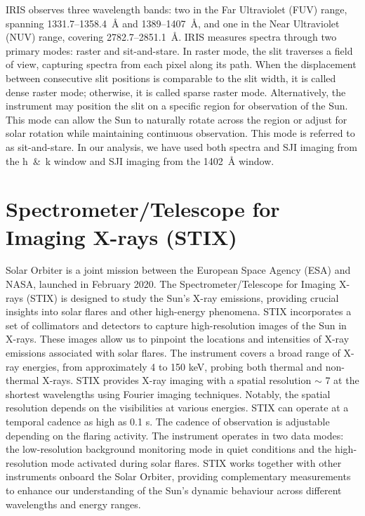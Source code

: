 IRIS observes three wavelength bands: two in the Far Ultraviolet (FUV) range, spanning 1331.7{--}1358.4~{\AA} and 1389{--}1407~{\AA}, and one in the Near Ultraviolet (NUV) range, covering 2782.7{--}2851.1~{\AA}. IRIS measures spectra through two primary modes: raster and sit-and-stare. In raster mode, the slit traverses a field of view, capturing spectra from each pixel along its path. When the displacement between consecutive slit positions is comparable to the slit width, it is called dense raster mode; otherwise, it is called sparse raster mode. Alternatively, the instrument may position the slit on a specific region for observation of the Sun. This mode can allow the Sun to naturally rotate across the region or adjust for solar rotation while maintaining continuous observation. This mode is referred to as sit-and-stare. In our analysis, we have used both spectra and SJI imaging from the  h~\&~k window and SJI imaging from the  1402~{\AA} window.

\section{Spectrometer/Telescope for Imaging X-rays (STIX)}

Solar Orbiter \citep[SO;][]{so} is a joint mission between the European Space Agency (ESA) and NASA, launched in February 2020. The Spectrometer/Telescope for Imaging X-rays (STIX) \citep[STIX,][]{stix,stix1} is designed to study the Sun's X-ray emissions, providing crucial insights into solar flares and other high-energy phenomena. STIX incorporates a set of collimators and detectors to capture high-resolution images of the Sun in X-rays. These images allow us to pinpoint the locations and intensities of X-ray emissions associated with solar flares. The instrument covers a broad range of X-ray energies, from approximately 4 to 150 keV, probing both thermal and non-thermal X-rays. STIX provides X-ray imaging with a spatial resolution $\sim$ 7 {\arcsec} at the shortest wavelengths using Fourier imaging techniques. Notably, the spatial resolution depends on the visibilities at various energies. STIX can operate at a temporal cadence as high as 0.1 s. The cadence of observation is adjustable depending on the flaring activity. The instrument operates in two data modes: the low-resolution background monitoring mode in quiet conditions and the high-resolution mode activated during solar flares. STIX works together with other instruments onboard the Solar Orbiter, providing complementary measurements to enhance our understanding of the Sun's dynamic behaviour across different wavelengths and energy ranges.

